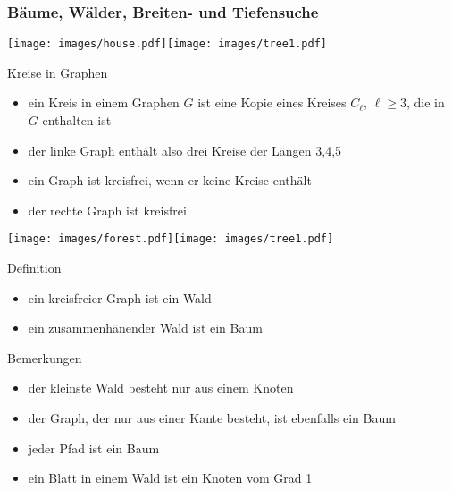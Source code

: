 \documentclass[aspectratio=1610, 11pt]{beamer}
\newcommand{\mytitle}{B\"aume, W\"alder, Breiten- und Tiefensuche}
\begin{document}
\begin{frame}\frametitle{\mytitle}
	\begin{overprint}
		\texttt{[image: images/house.pdf]}\hfill\texttt{[image: images/tree1.pdf]}
		\begin{exampleblock}{Kreise in Graphen}
			\begin{itemize}
				\item ein \alert{Kreis} in einem Graphen $G$ ist eine Kopie eines Kreises $C_\ell$, $\ell\geq3$, die in $G$ enthalten ist
				\item der linke Graph enth\"alt also drei Kreise der L\"angen 3,4,5
				\item ein Graph ist \alert{kreisfrei}, wenn er keine Kreise enth\"alt
				\item der rechte Graph ist kreisfrei
			\end{itemize}
		\end{exampleblock}
		\texttt{[image: images/forest.pdf]}\hfill\texttt{[image: images/tree1.pdf]}
		\begin{block}{Definition}
			\begin{itemize}
				\item ein kreisfreier Graph ist ein \alert{Wald}
				\item ein zusammenh\"anender Wald ist ein \alert{Baum}
			\end{itemize}
		\end{block}
		\begin{exampleblock}{Bemerkungen}
			\begin{itemize}
				\item der kleinste Wald besteht nur aus einem Knoten	
				\item der Graph, der nur aus einer Kante besteht, ist ebenfalls ein Baum
				\item jeder Pfad ist ein Baum
				\item ein \alert{Blatt} in einem Wald ist ein Knoten vom Grad 1
			\end{itemize}
		\end{exampleblock}
	\end{overprint}
\end{frame}
\end{document}
